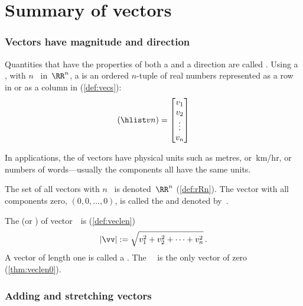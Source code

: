 
\section{Summary of vectors}
\label{sec:sumv}


\begin{itemize}
\def\index#1{}%

\subsubsection{Vectors have magnitude and direction}

\itemme Quantities that have the properties of both a  and a direction are called .  
Using a , with \(n\)~ in~\(\RR^n\), a  is an ordered \(n\)-tuple of real numbers represented as a row in  or as a column in  (\cref{def:vecs}):
\begin{equation*}
(\hlist vn)=\begin{bmatrix} v_1\\v_2\\\vdots\\v_n \end{bmatrix}
\end{equation*}

In applications, the  of vectors have physical units such as metres, or~km/hr, or numbers of words---usually the components all have the same units.

\itemme The set of all vectors with \(n\)~ is denoted~\(\RR^n\) (\cref{def:rRn}).
The vector with all components zero,  \((0,0,\ldots,0)\), is called the  and denoted by~\ov.

\itemhi  The  (or ) of vector~\vv\  is  (\cref{def:veclen})
\begin{equation*}
|\vv|:=\sqrt{v_1^2+v_2^2+\cdots+v_n^2}\,.
\end{equation*}
A vector of length one is called a .
The ~\ov\ is the only vector of  zero (\cref{thm:veclen0}).




\subsubsection{Adding and stretching vectors}


\end{itemize}
